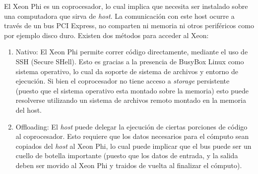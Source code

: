 El Xeon Phi es un coprocesador, lo cual implica que necesita ser instalado sobre una computadora que sirva de \textit{host}. La comunicación con este host
ocurre a través de un bus PCI Express, no comparten ni memoria ni otros perif\'ericos como por ejemplo disco duro. Existen dos métodos para acceder al Xeon:

\begin{enumerate}
    \item Nativo: El Xeon Phi permite correr código directamente, mediante el uso de SSH (Secure SHell). Esto es gracias a la presencia de BusyBox Linux como sistema operativo,
    lo cual da soporte de sistema de archivos y entorno de ejecución. Si bien el coprocesador no tiene acceso a \textit{storage} persistente (puesto que el sistema operativo esta montado sobre la
    memoria) esto puede resolverse utilizando un sistema de archivos remoto montado en la memoria del host.
    \item Offloading: El \textit{host} puede delegar la ejecución de ciertas porciones de código al coprocesador. Esto requiere que los datos necesarios para el cómputo sean copiados del \textit{host}
    al Xeon Phi, lo cual puede implicar que el bus puede ser un cuello de botella importante (puesto que los datos de entrada, y la salida deben ser movido al Xeon Phi y traidos de vuelta al finalizar
    el c\'omputo).
\end{enumerate}
